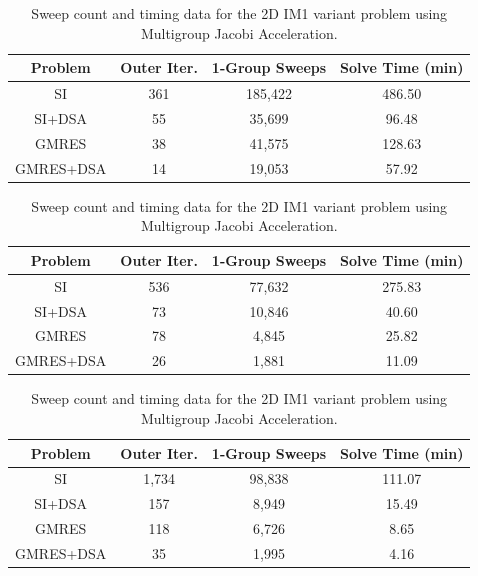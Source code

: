 \begin{table}
\caption{Sweep count and timing data for the 2D IM1 variant problem using Two-Grid Acceleration.}
\centering
\def\arraystretch{1.25}
\begin{tabular}{|c|c|c|c|}
\hline
Problem & Outer Iter.  & 1-Group Sweeps & Solve Time (min)  \\
\hline \hline
{SI} & {361}  &{185,422}  &  {486.50} \\ \hline
SI+DSA & 55 & 35,699 &  96.48 \\ \hline
GMRES & 38  & 41,575 &  128.63 \\ \hline
GMRES+DSA & 14  & 19,053  & 57.92  \\ \hline
\end{tabular}
\label{tab::IM1_2D_TG}
\vspace{1.5cm}
\caption{Sweep count and timing data for the 2D IM1 variant problem using Modified Two-Grid Acceleration.}
\centering
\def\arraystretch{1.25}
\begin{tabular}{|c|c|c|c|}
\hline
Problem & Outer Iter.  & 1-Group Sweeps & Solve Time (min)  \\
\hline \hline
{SI} & {536}  & {77,632} & {275.83}  \\ \hline
SI+DSA & 73  & 10,846 &  40.60 \\ \hline
GMRES & 78  & 4,845 &  25.82 \\ \hline
GMRES+DSA & 26  & 1,881 & 11.09  \\ \hline
\end{tabular}
\label{tab::IM1_2D_MTG}
\vspace{1.5cm}
\caption{Sweep count and timing data for the 2D IM1 variant problem using Multigroup Jacobi Acceleration.}
\centering
\def\arraystretch{1.25}
\begin{tabular}{|c|c|c|c|}
\hline
Problem & Outer Iter.  & 1-Group Sweeps & Solve Time (min)  \\
\hline \hline
{SI}  & {1,734} & {98,838} &  {111.07} \\ \hline
SI+DSA  & 157 & 8,949 &  15.49 \\ \hline
GMRES  & 118 & 6,726 &  8.65 \\ \hline
{GMRES+DSA} &   {35} & {1,995} &  {4.16} \\ \hline
\end{tabular}
\label{tab::IM1_2D_MJA}
\end{table}

